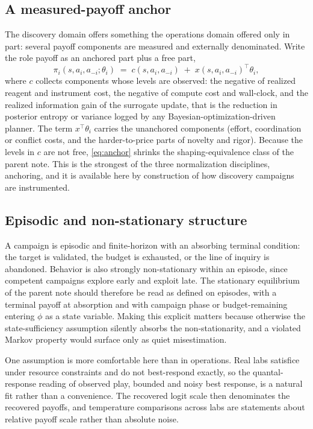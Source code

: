 \documentclass[11pt]{article}
\theoremstyle{definition}
\begin{document}
\subsection{A measured-payoff anchor}

The discovery domain offers something the operations domain offered only in part: several payoff components are measured and externally denominated. Write the role payoff as an anchored part plus a free part,
\begin{equation}
\pi_i(s,a_i,a_{-i};\theta_i)
\;=\;
c(s,a_i,a_{-i})
\;+\;
x(s,a_i,a_{-i})^{\top}\theta_i ,
\label{eq:anchor}
\end{equation}
where $c$ collects components whose levels are observed: the negative of realized reagent and instrument cost, the negative of compute cost and wall-clock, and the realized information gain of the surrogate update, that is the reduction in posterior entropy or variance logged by any Bayesian-optimization-driven planner. The term $x^{\top}\theta_i$ carries the unanchored components (effort, coordination or conflict costs, and the harder-to-price parts of novelty and rigor). Because the levels in $c$ are not free, \eqref{eq:anchor} shrinks the shaping-equivalence class of the parent note. This is the strongest of the three normalization disciplines, anchoring, and it is available here by construction of how discovery campaigns are instrumented.

\subsection{Episodic and non-stationary structure}

A campaign is episodic and finite-horizon with an absorbing terminal condition: the target is validated, the budget is exhausted, or the line of inquiry is abandoned. Behavior is also strongly non-stationary within an episode, since competent campaigns explore early and exploit late. The stationary equilibrium of the parent note should therefore be read as defined on episodes, with a terminal payoff at absorption and with campaign phase or budget-remaining entering $\phi$ as a state variable. Making this explicit matters because otherwise the state-sufficiency assumption silently absorbs the non-stationarity, and a violated Markov property would surface only as quiet misestimation.

One assumption is more comfortable here than in operations. Real labs satisfice under resource constraints and do not best-respond exactly, so the quantal-response reading of observed play, bounded and noisy best response, is a natural fit rather than a convenience. The recovered logit scale then denominates the recovered payoffs, and temperature comparisons across labs are statements about relative payoff scale rather than absolute noise.
\end{document}
